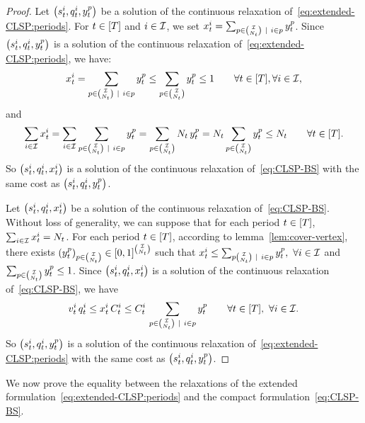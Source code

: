 \begin{proof}
Let $\bracket{\inventory_t^i, \quantity_t^i, y_t^p}$ be a solution of the continuous relaxation of~\eqref{eq:extended-CLSP:periods}.
For $t\in\range{\horizon}$ and $i\in\mathcal{I}$, we set $x_t^i=\sum_{p\in{\mathcal{I}\choose N_t}~|~i\in p} y_t^p$.
Since $\bracket{\inventory_t^i, \quantity_t^i, y_t^p}$ is a solution of the continuous relaxation of~\eqref{eq:extended-CLSP:periods}, we have:
$$
\setup_t^i
= \sum_{p\in{\REF\choose\nbsetups_t}~|~i\in p} y_t^p
\le \sum_{p\in{\REF\choose\nbsetups_t}} y_t^p
\le 1
\qquad \forall t\in\range{\horizon},\forall i\in\REF,
$$
and
$$
\sum_{i\in\REF}\setup_t^i
= \sum_{i\in\REF}\sum_{p\in{\REF\choose\nbsetups_t}~|~i\in p} y_t^p
= \sum_{p\in{\REF\choose\nbsetups_t}} \nbsetups_t\, y_t^p
= \nbsetups_t \sum_{p\in{\REF\choose\nbsetups_t}} y_t^p
\le \nbsetups_t
\qquad \forall t\in\range{\horizon}.
$$
So $\bracket{\inventory_t^i, \quantity_t^i, \setup_t^i}$  is a solution of the continuous relaxation of~\eqref{eq:CLSP-BS} with the same cost as $\bracket{\inventory_t^i, \quantity_t^i, y_t^p}$.


Let $\bracket{\inventory_t^i, \quantity_t^i, \setup_t^i}$ be a solution of the continuous relaxation of~\eqref{eq:CLSP-BS}. Without loss of generality, we can suppose that for each period $t\in\range{\horizon}$, $\sum_{i\in\mathcal{I}}x_t^i=N_t$.
For each period $t\in\range{\horizon}$, according to lemma~\ref{lem:cover-vertex}, there exists
$\bracket{y_t^p}_{p\in{\REF\choose\nbsetups_t}}\in\sqbracket{0,1}^{\REF\choose\nbsetups_t}$ such that
$x_t^i \le \sum_{p{\mathcal{I}\choose N_t}~|~i\in p} y_t^p,\ \forall i\in\mathcal{I}$ and
$\sum_{p\in{\mathcal{I}\choose N_t}}y_t^p \le 1$.
Since $\bracket{\inventory_t^i, \quantity_t^i, \setup_t^i}$ is a solution of the continuous relaxation of~\eqref{eq:CLSP-BS}, we have
$$
\rate_t^i\, \quantity_t^i
\le \setup_t^i\, \capacity_t^i
\le \capacity_t^i\, \sum_{p\in{\REF\choose\nbsetups_t}~|~i\in p} y_t^p
\qquad \forall t\in\range{\horizon},\ \forall i\in\REF.
$$
So $\bracket{\inventory_t^i, \quantity_t^i, y_t^p}$ is a solution of the continuous relaxation of~\eqref{eq:extended-CLSP:periods} with the same cost as $\bracket{\inventory_t^i, \quantity_t^i, y_t^p}$.
\end{proof}



We now prove the equality between the relaxations of the extended formulation~\eqref{eq:extended-CLSP:periods} and the compact formulation~\eqref{eq:CLSP-BS}.


